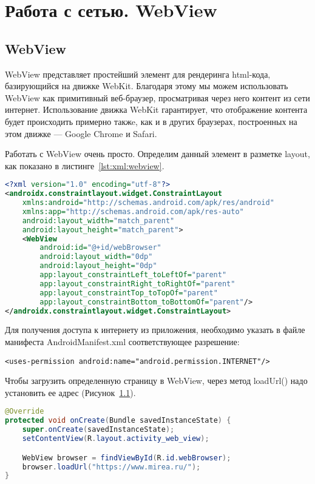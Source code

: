 \section{Работа с сетью. WebView}
\subsection{WebView}
WebView представляет простейший элемент для рендеринга html-кода,
базирующийся на движке WebKit. Благодаря этому мы можем использовать
WebView как примитивный веб-браузер, просматривая через него контент из
сети интернет. Использование движка WebKit гарантирует, что отображение
контента будет происходить примерно такжe, как и в других браузерах,
построенных на этом движке --- Google Chrome и Safari.\par
Работать с WebView очень просто. Определим данный элемент в разметке
layout, как показано в листинге~\ref{lst:xml:webview}.

\begin{lstlisting}[language=XML
	, label=lst:xml:webview
	]
<?xml version="1.0" encoding="utf-8"?>
<androidx.constraintlayout.widget.ConstraintLayout
    xmlns:android="http://schemas.android.com/apk/res/android"
    xmlns:app="http://schemas.android.com/apk/res-auto"
    android:layout_width="match_parent"
    android:layout_height="match_parent">
    <WebView
        android:id="@+id/webBrowser"
        android:layout_width="0dp"
        android:layout_height="0dp"
        app:layout_constraintLeft_toLeftOf="parent"
        app:layout_constraintRight_toRightOf="parent"
        app:layout_constraintTop_toTopOf="parent"
        app:layout_constraintBottom_toBottomOf="parent"/>
</androidx.constraintlayout.widget.ConstraintLayout>
\end{lstlisting}

Для получения доступа к интернету из приложения, необходимо указать в
файле манифеста AndroidManifest.xml соответствующее разрешение:

\begin{verbatim}
<uses-permission android:name="android.permission.INTERNET"/>
\end{verbatim}

Чтобы загрузить определенную страницу в WebView, через метод loadUrl()
надо установить ее адрес (Рисунок~\ref{}).

\begin{lstlisting}[language=Java
	, label=lst:
	]
@Override
protected void onCreate(Bundle savedInstanceState) {
	super.onCreate(savedInstanceState);
	setContentView(R.layout.activity_web_view);

	WebView browser = findViewById(R.id.webBrowser);
	browser.loadUrl("https://www.mirea.ru/");
}
\end{lstlisting}

